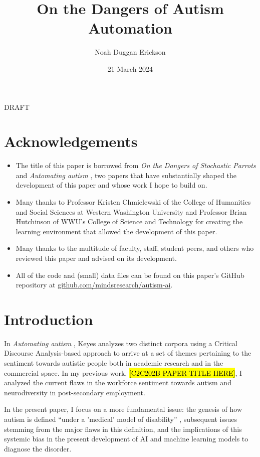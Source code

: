 \documentclass[letterpaper]{article}
\title{On the Dangers of Autism Automation}
\author{Noah Duggan Erickson}
\date{21 March 2024}
\begin{document}
\maketitle

{\Huge \centering DRAFT}

\section*{Acknowledgements}
\begin{itemize}
    \item The title of this paper is borrowed from \textit{On the Dangers of Stochastic Parrots} \cite{stopar} and \textit{Automating autism} \cite{auto}, two papers that have substantially shaped the development of this paper and whose work I hope to build on.
    \item Many thanks to Professor Kristen Chmielewski of the College of Humanities and Social Sciences at Western Washington University and Professor Brian Hutchinson of WWU's College of Science and Technology for creating the learning environment that allowed the development of this paper.
    \item Many thanks to the multitude of faculty, staff, student peers, and others who reviewed this paper and advised on its development.
    \item All of the code and (small) data files can be found on this paper's GitHub repository at \href{github.com/mindsresearch/autism-ai}{github.com/mindsresearch/autism-ai}.
\end{itemize}
\newpage
\tableofcontents
\newpage

\section{Introduction}
In \textit{Automating autism} \cite{auto}, Keyes analyzes two distinct corpora using a Critical Discourse Analysis-based approach to arrive at a set of themes pertaining to the sentiment towards autistic people both in academic research and in the commercial space. In my previous work, \hl{[C2C202B PAPER TITLE HERE]}, I analyzed the current flaws in the workforce sentiment towards autism and neurodiversity in post-secondary employment.

In the present paper, I focus on a more fundamental issue: the genesis of how autism is defined “under a 'medical' model of disability” \cite[p.~2]{auto}, subsequent issues stemming from the major flaws in this definition, and the implications of this systemic bias in the present development of AI and machine learning models to diagnose the disorder.
\end{document}
